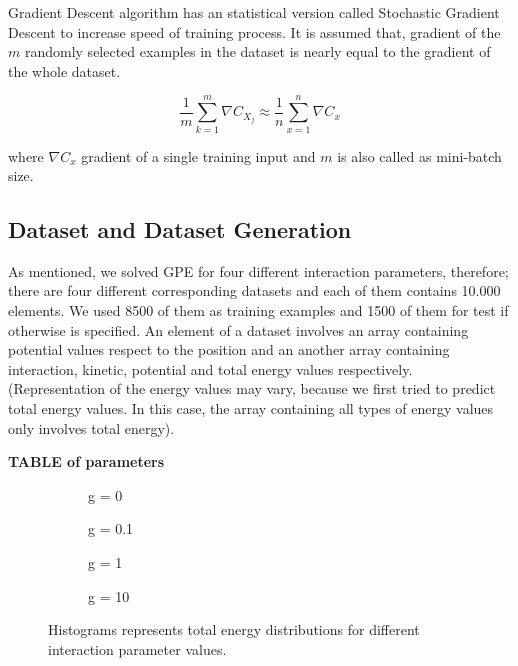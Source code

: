 \documentclass[a4paper,times,12pt]{article}
\begin{document}
Gradient Descent algorithm has an statistical version called Stochastic Gradient Descent to increase speed of training process. It is assumed that, gradient of the $m$ randomly selected examples in the dataset is nearly equal to the gradient of the whole dataset.

\begin{equation}
\label{eq:NT_Stochastic}
\frac{1}{m} \sum\limits_{k = 1}^{m} \nabla{C_{X_j}} \approx \frac{1}{n}\sum\limits_{x = 1}^{n} \nabla{C_{x}}
\end{equation}

where $\nabla{C_x}$ gradient of a single training input and $m$ is also called as mini-batch size.

\subsection{Dataset and Dataset Generation}

As mentioned, we solved GPE for four different interaction parameters, therefore; there are four different corresponding datasets and each of them contains 10.000 elements. We used 8500 of them as training examples and 1500 of them for test if otherwise is specified. An element of a dataset involves an array containing potential values respect to the position and an another array containing interaction, kinetic, potential and total energy values respectively. (Representation of the energy values may vary, because we first tried to predict total energy values. In this case, the array containing all types of energy values only involves total energy).

\textbf{TABLE of parameters}


\begin{figure}[H]
    \centering
    \begin{subfigure}[t]{0.45\textwidth}
        
        \caption{g = 0}
		\label{fig:a}
    \end{subfigure}
    \begin{subfigure}[t]{0.45\textwidth}
        
        \caption{g = 0.1}
		\label{fig:b}
    \end{subfigure}
    \begin{subfigure}[t]{0.45\textwidth}
        
        \caption{g = 1}
		\label{fig:c}
    \end{subfigure}
    \begin{subfigure}[t]{0.45\textwidth}
        
        \caption{g = 10}
		\label{fig:d}
    \end{subfigure}
    \caption{Histograms represents total energy distributions for different interaction parameter values.}
\label{fig:energy_dist}
\end{figure}
\end{document}
